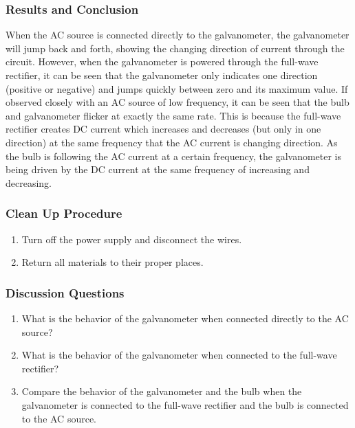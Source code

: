 \subsubsection*{Results and Conclusion}
When the AC source is connected directly to the galvanometer, the galvanometer will jump back and forth, showing the changing direction of current through the circuit.  However, when the galvanometer is powered through the full-wave rectifier, it can be seen that the galvanometer only indicates one direction (positive or negative) and jumps quickly between zero and its maximum value.
If observed closely with an AC source of low frequency, it can be seen that the bulb and galvanometer flicker at exactly the same rate.  This is because the full-wave rectifier creates DC current which increases and decreases (but only in one direction) at the same frequency that the AC current is changing direction.  As the bulb is following the AC current at a certain frequency, the galvanometer is being driven by the DC current at the same frequency of increasing and decreasing.

\subsubsection*{Clean Up Procedure}
\begin{enumerate}
\item{Turn off the power supply and disconnect the wires.}
\item{Return all materials to their proper places.}
\end{enumerate}

\subsubsection*{Discussion Questions}
\begin{enumerate}
\item{What is the behavior of the galvanometer when connected directly to the AC source?}
\item{What is the behavior of the galvanometer when connected to the full-wave rectifier?}
\item{Compare the behavior of the galvanometer and the bulb when the galvanometer is connected to the full-wave rectifier and the bulb is connected to the AC source.}
\end{enumerate}

